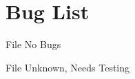 \chapter{Bug List}
\hypertarget{a00353}{}\label{a00353}

\begin{DoxyRefList}
\item[File \doxylink{a00074}{cache\+\_\+predictor.h} ]\label{a00353__bug000001}%
%
No Bugs 


\item[File \doxylink{a00131}{var\+Int\+File\+\_\+\+IO.h} ]\label{a00353__bug000002}%
%
Unknown, Needs Testing 
\end{DoxyRefList}